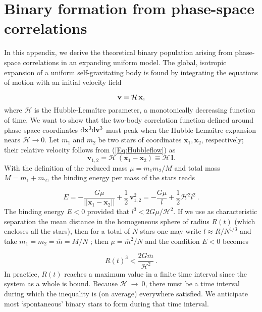 \chapter{Binary formation from phase-space correlations}
\label{App:phasespace}

In this appendix, we derive the theoretical binary population arising from phase-space correlations in an expanding uniform model. The global, isotropic expansion of a uniform self-gravitating body is found by integrating the equations of motion with an initial  velocity field 

\begin{equation}
 \bold{v} = \mathcal{H}\,\bold{x} , \label{Eq:Hubbleflow}
\end{equation}
where $\mathcal{H}$ is the Hubble-Lema\^itre parameter, a monotonically decreasing function of time. 
We want to show that the two-body correlation function defined around phase-space coordinates ${\rm d} \mathbf{x}^3 {\rm d} \mathbf{v}^3$ must peak when the Hubble-Lema\^itre expansion nears $\mathcal{H}  \rightarrow 0$. Let $m_1$ and $m_2$ be two stars of coordinates $\mathbf{x}_1, \mathbf{x}_2$, respectively; their relative velocity follows from 
(\ref{Eq:Hubbleflow}) as 
\[ \mathbf{v}_{1,2} = \mathcal{H}  ~ ( \mathbf{x}_1 - \mathbf{x}_2 ) \equiv \mathcal{H}\,\mathbf{l} .\]
With the definition of the reduced mass $ \mu = m_1 m_2 / M$ and total mass $M = m_1 + m_2$, the binding energy per mass  of the stars reads 

\begin{equation}
E = - \frac{G \mu}{ || \mathbf{x}_1 - \mathbf{x}_2 || } + \frac{1}{2} \, \mathbf{v}_{1,2}^2 = - \frac{G\mu}{l} + \frac{1}{2} \mathcal{H}^2 l^2 \ . 
\end{equation}
 The binding energy $E < 0 $ provided that $l^3 < 2 G \mu / \mathcal{H}^2$. If we use as characteristic separation the mean 
 distance in the homogeneous sphere of radius $R(t)$ (which encloses all the stars), then for a total of $N$ stars one 
 may write $ l \approx R / N^{1/3}$ and take $ m_1 = m_2 = \overline{m} =  M / N $ ; then $\mu = \overline{m}^2/N$ and 
 the condition $E < 0 $ becomes 
 
 \[ R(t)^3 < \frac{2G\overline{m}}{\mathcal{H}^2}\ . \] 
 In practice, $R(t)$ reaches a maximum value in a finite time interval since the system as a whole is bound. Because $\mathcal{H}~\rightarrow~0$, there must be a time interval during which the inequality is (on average) 
 everywhere satisfied. We anticipate most `spontaneous' binary stars to form during that time interval. 
 
